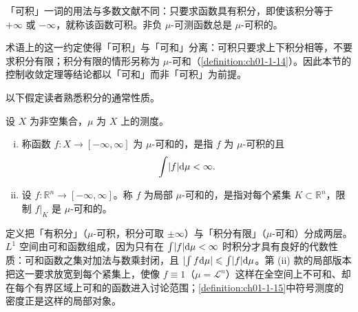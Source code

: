 \documentclass[../../main.tex]{subfiles}%
\begin{document}
\begin{remark}\label{remark:ch01-def-1-13-可积约定}
「可积」一词的用法与多数文献不同：只要求函数具有积分，即使该积分等于 $+\infty$ 或 $-\infty$，就称该函数可积。非负 $\mu$-可测函数总是 $\mu$-可积的。

术语上的这一约定使得「可积」与「可和」分离：可积只要求上下积分相等，不要求积分有限；积分有限的情形另称为 $\mu$-可和（\cref{definition:ch01-1-14}）。因此本节的控制收敛定理等结论都以「可和」而非「可积」为前提。%
\end{remark}

以下假定读者熟悉积分的通常性质。

\begin{definition}[可和函数与局部可和函数]\label{definition:ch01-1-14}
设 $X$ 为非空集合，$\mu$ 为 $X$ 上的测度。
\begin{enumerate}[(i)]
\item 称函数 $f:X\to[-\infty,\infty]$ 为 $\mu$-可和的，是指 $f$ 为 $\mu$-可积的且
\begin{align*}
\int\lvert f\rvert\mathrm{d}\mu<\infty .
\end{align*}
\item 设 $f:\mathbb{R}^n\to[-\infty,\infty]$。称 $f$ 为局部 $\mu$-可和的，是指对每个紧集 $K\subset\mathbb{R}^n$，限制 $f|_{K}$ 是 $\mu$-可和的。
\end{enumerate}
\end{definition}

\begin{remark}\label{remark:ch01-def-1-14-动机}
定义把「有积分」（$\mu$-可积，积分可取 $\pm\infty$）与「积分有限」（$\mu$-可和）分成两层。$L^1$ 空间由可和函数组成，因为只有在 $\int\lvert f\rvert\mathrm{d}\mu<\infty$ 时积分才具有良好的代数性质：可和函数之集对加法与数乘封闭，且 $\lvert\int f\mathrm{d}\mu\rvert\leqslant\int\lvert f\rvert\mathrm{d}\mu$。第 (ii) 款的局部版本把这一要求放宽到每个紧集上，使像 $f\equiv1$（$\mu=\mathcal{L}^n$）这样在全空间上不可和、却在每个有界区域上可和的函数进入讨论范围；\cref{definition:ch01-1-15}中符号测度的密度正是这样的局部对象。%
\end{remark}
\end{document}
